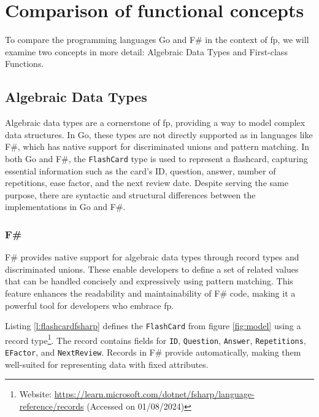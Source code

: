 
\chapter{Comparison of functional concepts}\label{chap:comparison}
To compare the programming languages Go and F\# in the context of \ac{fp}, we will examine two concepts in more detail: Algebraic Data Types and First-class Functions. 

    \section{Algebraic Data Types}\label{sec:algebraic-data-types}

    Algebraic data types are a cornerstone of \ac{fp}, providing a way to model complex data structures. In Go, these types are not directly supported as in languages like F\#, which has native support for discriminated unions and pattern matching. In both Go and F\#, the \texttt{FlashCard} type is used to represent a flashcard, capturing essential information such as the card's ID, question, answer, number of repetitions, ease factor, and the next review date. Despite serving the same purpose, there are syntactic and structural differences between the implementations in Go and F\#.

    \subsection*{F\#}
    F\# provides native support for algebraic data types through record types and discriminated unions. These enable developers to define a set of related values that can be handled concisely and expressively using pattern matching. This feature enhances the readability and maintainability of F\# code, making it a powerful tool for developers who embrace \ac{fp}.

    Listing \ref{l:flashcardfsharp} defines the \texttt{FlashCard} from figure \ref{fig:model} using a record type\footnote{Website: \url{https://learn.microsoft.com/dotnet/fsharp/language-reference/records} (Accessed on 01/08/2024)}. The record contains fields for \texttt{ID}, \texttt{Question}, \texttt{Answer}, \texttt{Repetitions}, \texttt{EFactor}, and \texttt{NextReview}. Records in F\# provide automatically, making them well-suited for representing data with fixed attributes.

